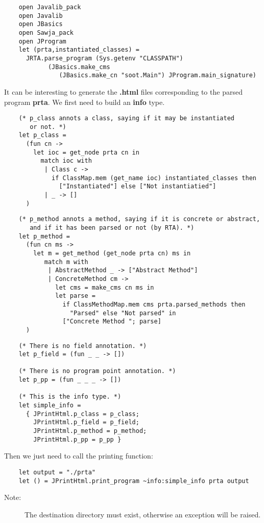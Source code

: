 \documentclass{article}
\begin{document}
\begin{verbatim}
    open Javalib_pack
    open Javalib
    open JBasics
    open Sawja_pack
    open JProgram
    let (prta,instantiated_classes) =
      JRTA.parse_program (Sys.getenv "CLASSPATH")
            (JBasics.make_cms
               (JBasics.make_cn "soot.Main") JProgram.main_signature)
\end{verbatim}
It can be interesting to generate the \textbf{.html} files
corresponding to the parsed program \textbf{prta}. We first need to
build an \textbf{info} type.

\begin{verbatim}
    (* p_class annots a class, saying if it may be instantiated
       or not. *)
    let p_class =
      (fun cn ->
        let ioc = get_node prta cn in
          match ioc with
           | Class c ->
             if ClassMap.mem (get_name ioc) instantiated_classes then
               ["Instantiated"] else ["Not instantiatied"]
           | _ -> []
      )
\end{verbatim}
\begin{verbatim}
    (* p_method annots a method, saying if it is concrete or abstract,
       and if it has been parsed or not (by RTA). *)
    let p_method =
      (fun cn ms ->
        let m = get_method (get_node prta cn) ms in
           match m with
            | AbstractMethod _ -> ["Abstract Method"]
            | ConcreteMethod cm ->
              let cms = make_cms cn ms in
              let parse =
                if ClassMethodMap.mem cms prta.parsed_methods then
                  "Parsed" else "Not parsed" in
                ["Concrete Method "; parse]
      )
\end{verbatim}
\begin{verbatim}
    (* There is no field annotation. *)
    let p_field = (fun _ _ -> [])

    (* There is no program point annotation. *)
    let p_pp = (fun _ _ _ -> [])

    (* This is the info type. *)
    let simple_info = 
      { JPrintHtml.p_class = p_class;
        JPrintHtml.p_field = p_field;
        JPrintHtml.p_method = p_method;
        JPrintHtml.p_pp = p_pp }
\end{verbatim}
Then we just need to call the printing function:

\begin{verbatim}
    let output = "./prta"
    let () = JPrintHtml.print_program ~info:simple_info prta output
\end{verbatim}
\begin{description}
\item[Note:]
The destination directory must exist, otherwise an exception will
be raised.
\end{description}
\end{document}
